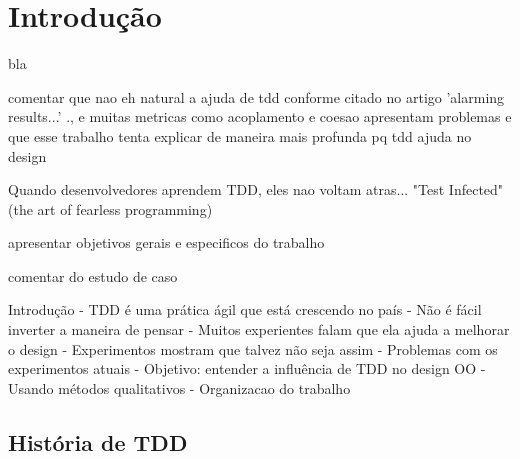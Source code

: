 \chapter{Introdução}
\label{cap:introducao}

bla

comentar que nao eh natural a ajuda de tdd conforme citado no artigo 'alarming results...' ., e muitas metricas como
acoplamento e coesao apresentam problemas
e que esse
trabalho tenta explicar de maneira mais profunda pq tdd ajuda no design

Quando desenvolvedores aprendem TDD, eles nao voltam atras... "Test Infected" (the art of fearless programming)

apresentar objetivos gerais e especificos do trabalho

comentar do estudo de caso

Introdução
- TDD é uma prática ágil que está crescendo no país
- Não é fácil inverter a maneira de pensar
- Muitos experientes falam que ela ajuda a melhorar o design
- Experimentos mostram que talvez não seja assim
- Problemas com os experimentos atuais
- Objetivo: entender a influência de TDD no design OO
- Usando métodos qualitativos
- Organizacao do trabalho

\section{História de TDD}